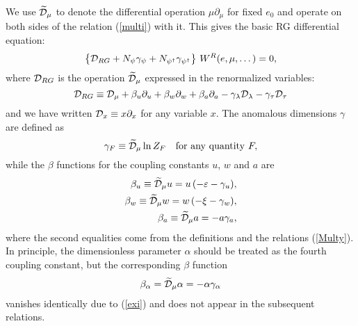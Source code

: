 \documentclass[12pt]{iopart}
\begin{document}
We use $\widetilde{\cal D}_{\mu}$ to denote the differential
operation $\mu\partial_{\mu}$ for fixed $e_{0}$ and operate on
both sides of the relation (\ref{multi}) with it. This gives the
basic RG differential equation:
\begin{equation}
\left\{ {\cal D}_{RG} + N_{\psi} \gamma_{\psi} + N_{\psi^{\dag}}
\gamma_{\psi^{\dag}} \right\} \,W^{R}(e,\mu,\dots) = 0,
\label{RG1}
\end{equation}
where ${\cal D}_{RG}$ is the operation $\widetilde{\cal D}_{\mu}$
expressed in the renormalized variables:
\begin{equation}
{\cal D}_{RG}\equiv {\cal D}_{\mu} + \beta_{u}\partial_{u} +
\beta_{w}\partial_{w}  + \beta_{a}\partial_{a} -
\gamma_{\lambda}{\cal D}_{\lambda} - \gamma_{\tau}{\cal D}_{\tau}
\label{RG2}
\end{equation}
and we have written ${\cal D}_{x}\equiv x\partial_{x}$ for any
variable $x$. The anomalous dimensions $\gamma$ are defined as
\begin{equation}
\gamma_{F}\equiv \widetilde{\cal D}_{\mu} \ln Z_{F} \quad {\rm for\ any\ quantity} \ F,
\label{RGF1}
\end{equation}
while the $\beta$ functions for the coupling constants $u$, $w$ and $a$ are
\begin{eqnarray}
\beta _{u} \equiv \widetilde {\cal D}_{\mu} u = u\,
(-\varepsilon-\gamma_{u}),
\nonumber \\
\beta_{w} \equiv \widetilde {\cal D}_{\mu} w =
w\,(-\xi-\gamma_{w}),
\nonumber \\
\beta_{a} \equiv \widetilde {\cal D}_{\mu} a = -a\gamma_{a},
\label{betagw}
\end{eqnarray}
where the second equalities come from the definitions and the
relations (\ref{Multy}). In principle, the dimensionless parameter
$\alpha$ should be treated as the fourth coupling constant, but the
corresponding $\beta$ function
\begin{eqnarray}
\beta_{\alpha}=\widetilde{\cal
D}_{\mu}\alpha=-\alpha\gamma_{\alpha} \label{Bal}
\end{eqnarray}
vanishes identically due to (\ref{exi}) and does not appear in the
subsequent relations.
\end{document}
